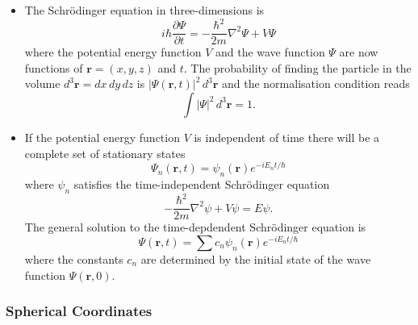 \documentclass{article}
\renewcommand{\vec}[1]{\boldsymbol{\mathbf{#1}}}
\begin{document}
\begin{itemize}
  \item The Schrödinger equation in three-dimensions is \[i \hbar \frac{\partial \Psi}{\partial t} = -\frac{\hbar^2}{2 m} \nabla^2 \Psi + V \Psi\] where the potential energy function $V$ and the wave function $\Psi$ are now functions of $\vec{r} = (x, y, z)$ and $t$. The probability of finding the particle in the volume $d^3 \vec{r} = d x \,d y \,d z$ is $|\Psi(\vec{r}, t)|^2 \,d^3 \vec{r}$ and the normalisation condition reads \[\int |\Psi|^2 \,d^3 \vec{r} = 1.\]

  \item If the potential energy function $V$ is independent of time there will be a complete set of stationary states \[\Psi_n(\vec{r}, t) = \psi_n(\vec{r}) e^{-i E_n t / \hbar}\] where $\psi_n$ satisfies the time-independent Schrödinger equation \[-\frac{\hbar^2}{2 m} \nabla^2 \psi + V \psi = E \psi.\] The general solution to the time-depdendent Schrödinger equation is \[\Psi(\vec{r}, t) = \sum c_n \psi_n(\vec{r}) e^{-i E_n t / \hbar}\] where the constants $c_n$ are determined by the initial state of the wave function $\Psi(\vec{r}, 0)$.
\end{itemize}

\subsubsection{Spherical Coordinates}
\end{document}
